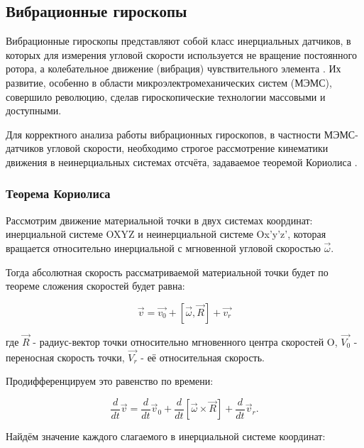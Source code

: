 \subsection{Вибрационные гироскопы}

Вибрационные гироскопы представляют собой класс инерциальных датчиков, в которых для измерения угловой скорости используется не вращение постоянного ротора, а колебательное движение (вибрация) чувствительного элемента \cite{mems_sensors}. Их развитие, особенно в области микроэлектромеханических систем (МЭМС), совершило революцию, сделав гироскопические технологии массовыми и доступными.

Для корректного анализа работы вибрационных гироскопов, в частности МЭМС-датчиков угловой скорости, необходимо строгое рассмотрение кинематики движения в неинерциальных системах отсчёта, задаваемое теоремой Кориолиса \cite{persson2005coriolis}.


\subsubsection{Теорема Кориолиса}

Рассмотрим движение материальной точки в двух системах координат: инерциальной системе OXYZ и неинерциальной системе Ox'y'z', которая вращается относительно инерциальной с мгновенной угловой скоростью $\vec{\omega}$.

Тогда абсолютная скорость рассматриваемой материальной точки будет по теореме сложения скоростей будет равна:

\begin{equation}
	\vec{v} = \vec{v_{0}} + [\vec{\omega}, \vec{R}] + \vec{v_{r}}
\end{equation}

где $\vec{R}$ - радиус-вектор точки относительно мгновенного центра скоростей 
O, $\vec{V_{0}}$ - переносная скорость точки, $\vec{V_{r}}$ - её относительная скорость.

Продифференцируем это равенство по времени:

\begin{equation}
	\frac{d}{dt} \vec{v} = \frac{d}{dt} \vec{v}_0 + \frac{d}{dt} \left[ \vec{\omega} \times \vec{R} \right] + \frac{d}{dt} \vec{v}_r.
\end{equation}


Найдём значение каждого слагаемого в инерциальной системе координат:


